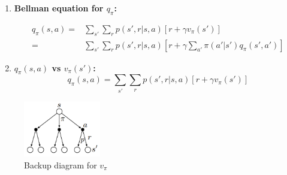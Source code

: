 \begin{enumerate}
    \item \textbf{Bellman equation for $q_{\pi}$:}

        \begin{equation}
        \begin{split}
            q_{\pi}(s,a) = & \sum_{s'} \sum_{r} p(s', r|s,a)[r+ \gamma v_{\pi}(s')] \\
                = & \sum_{s'}\sum_{r}p(s', r|s, a)[r+ \gamma \sum_{a'} \pi (a'|s') q_{\pi}(s',a')]
        \end{split}
        \end{equation}

    \item \textbf{$q_{\pi}(s,a)$ vs $v_{\pi}(s')$:}
        \begin{equation}
            q_{\pi}(s,a) =  \sum_{s'} \sum_{r} p(s', r|s,a)[r+ \gamma v_{\pi}(s')]
        \end{equation}
\end{enumerate}

\begin{figure}[htbp]
    \centering
    \includegraphics[width=0.3\textwidth]{figs/ch_3_5_1_dackup_diagram_for_vpi.png} 
    \caption{Backup diagram for $v_{\pi}$}
    \label{fig:dackup_diagram_for_vpi}
\end{figure}


